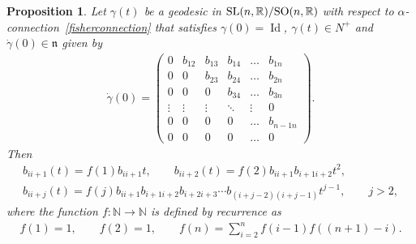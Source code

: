 \documentclass[10pt,a4paper]{amsart}
\numberwithin{equation}{section}
\newtheorem{Proposition}[Theorem]{Proposition}
{ \theoremstyle{definition}
\newtheorem{Definition}[Theorem]{Definition}
\newtheorem{Example}[Theorem]{Example}
\newtheorem{Remark}[Theorem]{Remark}}
\begin{document}
\begin{Proposition}\label{geodesicN}
Let $\gamma(t)$ be a geodesic in ${\rm SL}(n,{\mathbb R})/{\rm SO}(n,{\mathbb R})$ with respect to $\alpha$-connec\-tion~\eqref{fisherconnection} that satisfies $\gamma(0) = \operatorname{Id}$,
$\gamma(t) \in N^+$ and $\dot{\gamma}(0) \in \mathfrak{n}$ given by
  \begin{gather*}
    \dot{\gamma}(0) =
    \left(
    \begin{matrix}
      0      & b_{12} & b_{13} & b_{14} &\ldots & b_{1n} \\
      0      &   0    & b_{23} & b_{24} &\ldots & b_{2n} \\
      0      &   0    &   0    & b_{34} &\ldots & b_{3n} \\
      \vdots & \vdots & \vdots & \ddots &\vdots &  0   \\
      0      &   0    &   0    & 0      &\ldots & b_{n-1n} \\
      0      &   0    &   0    & 0      &\ldots & 0
    \end{matrix}
    \right).
  \end{gather*}
  Then
  \begin{gather*}
    b_{ii+1}(t)   =   f(1)b_{ii+1}t,\qquad
    b_{ii+2}(t)   =   f(2)b_{ii+1}b_{i+1i+2}t^2,\\
    b_{ii+j}(t)   =   f(j)b_{ii+1}b_{i+1i+2}b_{i+2i+3}\cdots b_{(i+j-2)(i+j-1)}t^{j-1}, \qquad j>2,
  \end{gather*}
  where the function $f\colon \mathbb{N} \rightarrow \mathbb{N}$ is defined by recurrence as
  \begin{gather*}
    f(1)   =   1, \qquad
    f(2)   =   1, \qquad
    f(n)   =   \sum_{i=2}^{n} f(i-1)f((n+1)-i).
  \end{gather*}
\end{Proposition}
\end{document}
